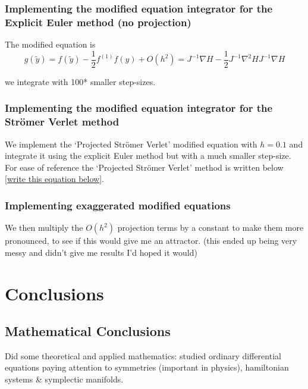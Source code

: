 \documentclass[12pt]{article}
\begin{document}
\subsubsection{Implementing the modified equation integrator for the Explicit Euler method (no projection)}
The modified equation is
$$g(\widetilde y) = f(\widetilde y) - \frac{1}{2}f^{(1)}f(y) + O(h^2) = J^{-1}\nabla H - \frac{1}{2}J^{-1}\nabla^2 H J^{-1}\nabla H$$

we integrate with 100* smaller step-sizes.


\subsubsection{Implementing the modified equation integrator for the Str\"omer Verlet method}
We implement the `Projected Str\"omer Verlet' modified equation with $h=0.1$ and integrate it using the explicit Euler method but with a much smaller step-size. For ease of reference the `Projected Str\"omer Verlet' method is written below \eqref{write this equation below}.



\subsubsection{Implementing exaggerated modified equations}
We then multiply the $O(h^2)$ projection terms by a constant to make them more pronounced, to see if this would give me an attractor. (this ended up being very messy and didn't give me results I'd hoped it would)


\section{Conclusions}
\subsection{Mathematical Conclusions}
Did some theoretical and applied mathematics: studied ordinary differential equations paying attention to symmetries (important in physics), hamiltonian systems \& symplectic manifolds. 
\end{document}
